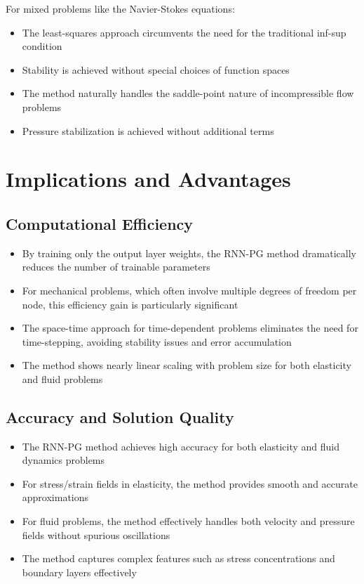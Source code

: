 \documentclass[11pt,a4paper]{article}
\begin{document}
For mixed problems like the Navier-Stokes equations:

\begin{itemize}
    \item The least-squares approach circumvents the need for the traditional inf-sup condition
    \item Stability is achieved without special choices of function spaces
    \item The method naturally handles the saddle-point nature of incompressible flow problems
    \item Pressure stabilization is achieved without additional terms
\end{itemize}

\section{Implications and Advantages}

\subsection{Computational Efficiency}

\begin{itemize}
    \item By training only the output layer weights, the RNN-PG method dramatically reduces the number of trainable parameters
    \item For mechanical problems, which often involve multiple degrees of freedom per node, this efficiency gain is particularly significant
    \item The space-time approach for time-dependent problems eliminates the need for time-stepping, avoiding stability issues and error accumulation
    \item The method shows nearly linear scaling with problem size for both elasticity and fluid problems
\end{itemize}

\subsection{Accuracy and Solution Quality}

\begin{itemize}
    \item The RNN-PG method achieves high accuracy for both elasticity and fluid dynamics problems
    \item For stress/strain fields in elasticity, the method provides smooth and accurate approximations
    \item For fluid problems, the method effectively handles both velocity and pressure fields without spurious oscillations
    \item The method captures complex features such as stress concentrations and boundary layers effectively
\end{itemize}
\end{document}
